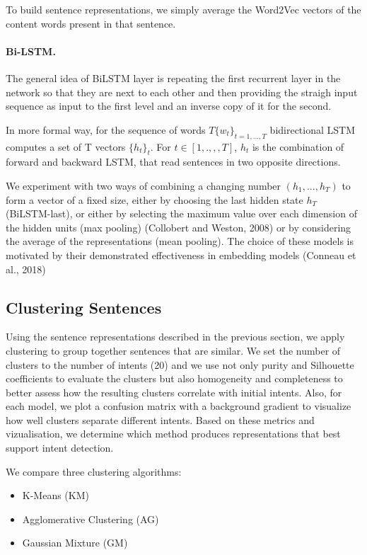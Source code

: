 \documentclass[11pt]{article}
\begin{document}
To build sentence representations, we simply average the Word2Vec
vectors of the content words present in that sentence.

\paragraph{Bi-LSTM.} The general idea of BiLSTM layer is repeating the first recurrent layer in the network so that they are next to each other and then providing the straigh input sequence as input to the first level and an inverse copy of it for the second.

In more formal way, for the sequence of words $T \{w_{t}\}_{t = 1, ..., T}$ bidirectional LSTM computes a set of T vectors $\{h_{t}\}_{t}$. For $t ∈ [1 ,. ,,, T]$, $h_{t}$ is the combination of forward and backward LSTM, that read sentences in two opposite directions. 

We experiment with two ways of combining a changing number $(h_{1}, ..., h_{T})$ to form a vector of a fixed size, either by choosing the last hidden state $h_{T}$ (BiLSTM-last), or either by selecting the maximum value over each dimension of the hidden units (max pooling) (Collobert and Weston, 2008) or by considering the average of the representations (mean pooling). The choice of these models is motivated by their demonstrated effectiveness in embedding models (Conneau et al., 2018) 


\subsection{Clustering Sentences}
\label{subsec:clustering}
Using the sentence representations described in the previous section,
we apply clustering to group together sentences that are similar.  We
set the number of clusters to the number of intents (20) and we use
not only purity and Silhouette coefficients to evaluate the clusters
but also homogeneity and completeness to better assess how the
resulting clusters correlate with initial intents. Also, for each
model, we plot a confusion matrix with a background gradient to
visualize how well clusters separate different intents. Based on these
metrics and vizualisation, we determine which method produces
representations that best support intent detection.

We compare three clustering algorithms:

\begin{itemize}
\item K-Means (KM)
\item Agglomerative Clustering (AG)
\item Gaussian Mixture (GM)
\end{itemize}
\end{document}
